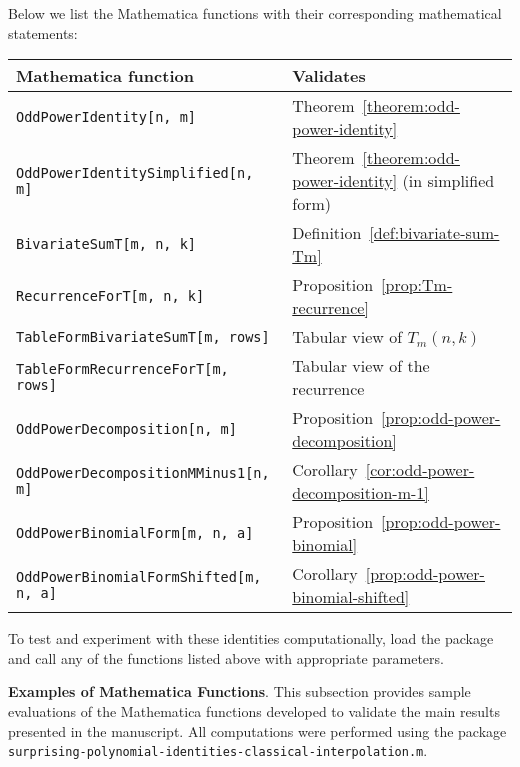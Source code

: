 Below we list the Mathematica functions with their corresponding mathematical statements:
\begin{center}
    \renewcommand{\arraystretch}{1.4}
    \begin{tabular}{ll}
        \toprule
        \textbf{Mathematica function}                 & \textbf{Validates}                                            \\
        \midrule
        \texttt{OddPowerIdentity[n, m]}               & Theorem~\ref{theorem:odd-power-identity}                      \\
        \texttt{OddPowerIdentitySimplified[n, m]}     & Theorem~\ref{theorem:odd-power-identity} (in simplified form) \\
        \texttt{BivariateSumT[m, n, k]}               & Definition~\ref{def:bivariate-sum-Tm}                         \\
        \texttt{RecurrenceForT[m, n, k]}              & Proposition~\ref{prop:Tm-recurrence}                          \\
        \texttt{TableFormBivariateSumT[m, rows]}      & Tabular view of $T_m(n,k)$                                    \\
        \texttt{TableFormRecurrenceForT[m, rows]}     & Tabular view of the recurrence                                \\
        \texttt{OddPowerDecomposition[n, m]}          & Proposition~\ref{prop:odd-power-decomposition}                \\
        \texttt{OddPowerDecompositionMMinus1[n, m]}   & Corollary~\ref{cor:odd-power-decomposition-m-1}               \\
        \texttt{OddPowerBinomialForm[m, n, a]}        & Proposition~\ref{prop:odd-power-binomial}                     \\
        \texttt{OddPowerBinomialFormShifted[m, n, a]} & Corollary~\ref{prop:odd-power-binomial-shifted}               \\
        \bottomrule
    \end{tabular}
\end{center}
To test and experiment with these identities computationally, load the package and call any of the
functions listed above with appropriate parameters.

\textbf{Examples of Mathematica Functions}.
This subsection provides sample evaluations of the Mathematica functions
developed to validate the main results presented in the manuscript.
All computations were performed using the package \\
\texttt{surprising-polynomial-identities-classical-interpolation.m}.

